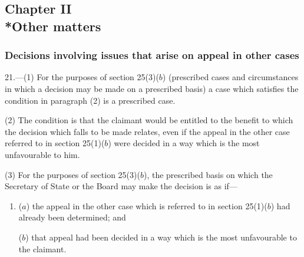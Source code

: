 \documentclass[12pt,a4paper]{article}
\begin{document}
\subsection[Chapter II --- Other matters]{Chapter II\\*Other matters}

\subsubsection[21. Decisions involving issues that arise on appeal in other cases]{Decisions involving issues that arise on appeal in other cases}

\renewcommand\parthead{--- Part III Chapter II}

21.—(1) For the purposes of section 25(3)($b$) (prescribed cases and circumstances in which a decision may be made on a prescribed basis) a case which satisfies the condition in paragraph (2) is a prescribed case.

(2) The condition is that the claimant would be entitled to the benefit to which the decision which falls to be made relates, even if the appeal in the other case referred to in section 25(1)($b$) were decided in a way which is the most unfavourable to him.

(3) For the purposes of section 25(3)($b$), the prescribed basis on which the Secretary of State 
or the Board  %
may make the decision is as if—
\begin{enumerate}\item[]
($a$) the appeal in the other case which is referred to in section 25(1)($b$) had already been determined; and

($b$) that appeal had been decided in a way which is the most unfavourable to the claimant.
\end{enumerate}
\end{document}
